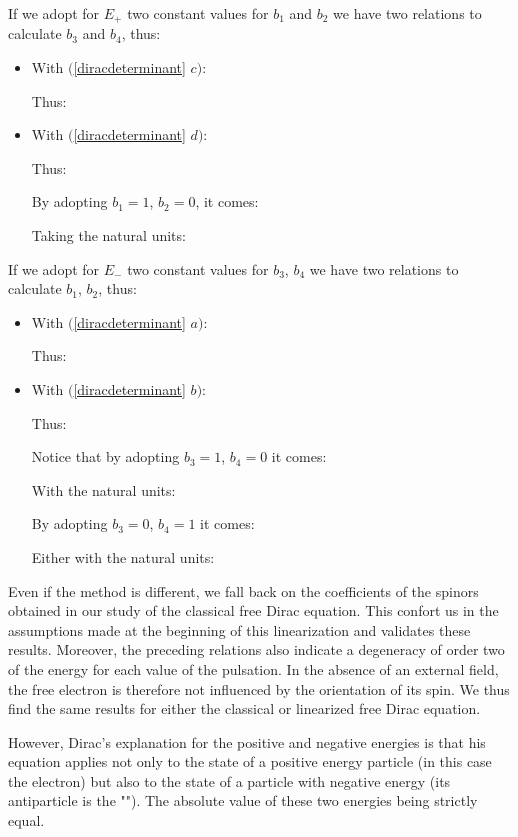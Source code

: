 	If we adopt for $E_{+}$ two constant values for $b_1$ and $b_2$ we have two relations to calculate $b_3$ and $b_4$, thus:
	\begin{itemize}
		\item With $($\ref{diracdeterminant} $c)$:
		
		Thus:
		
		
		\item With $($\ref{diracdeterminant} $d)$:
		
		Thus:
		
		By adopting $b_1=1$, $b_2=0$, it comes:
		
		Taking the natural units:
		
	\end{itemize}
	If we adopt for $E_{-}$ two constant values for $b_3$, $b_4$ we have two relations to calculate $b_1$, $b_2$, thus:
	\begin{itemize}
		\item With $($\ref{diracdeterminant} $a)$:
		
		Thus:
		
	
		\item With $($\ref{diracdeterminant} $b)$:
		
		Thus:
		
		Notice that by adopting $b_3=1$, $b_4=0$ it comes:
		
		With the natural units:
		
		By adopting $b_3=0$, $b_4=1$ it comes:
		
		Either with the natural units:
		
	\end{itemize}
	Even if the method is different, we fall back on the coefficients of the spinors obtained in our study of the classical free Dirac equation. This confort us in the assumptions made at the beginning of this linearization and validates these results. Moreover, the preceding relations also indicate a degeneracy of order two of the energy for each value of the pulsation. In the absence of an external field, the free electron is therefore not influenced by the orientation of its spin. We thus find the same results for either the classical or linearized free Dirac equation.

	However, Dirac's explanation for the positive and negative energies is that his equation applies not only to the state of a positive energy particle (in this case the electron) but also to the state of a particle with negative energy (its antiparticle is the ""). The absolute value of these two energies being strictly equal.

